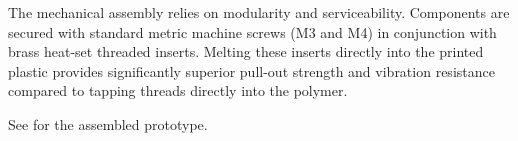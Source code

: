 The mechanical assembly relies on modularity and serviceability. Components are secured with standard metric machine screws (M3 and M4) in conjunction with brass heat-set threaded inserts. Melting these inserts directly into the printed plastic provides significantly superior pull-out strength and vibration resistance compared to tapping threads directly into the polymer.

See  for the assembled prototype.
